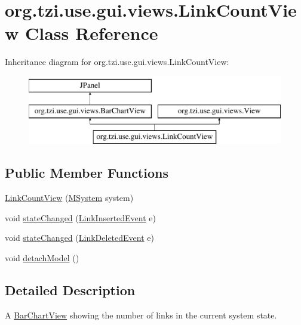 \hypertarget{classorg_1_1tzi_1_1use_1_1gui_1_1views_1_1_link_count_view}{\section{org.\-tzi.\-use.\-gui.\-views.\-Link\-Count\-View Class Reference}
\label{classorg_1_1tzi_1_1use_1_1gui_1_1views_1_1_link_count_view}
}
Inheritance diagram for org.\-tzi.\-use.\-gui.\-views.\-Link\-Count\-View\-:\begin{figure}[H]
\begin{center}
\leavevmode
\includegraphics[height=3.000000cm]{classorg_1_1tzi_1_1use_1_1gui_1_1views_1_1_link_count_view}
\end{center}
\end{figure}
\subsection*{Public Member Functions}
\begin{DoxyCompactItemize}
\item 
\hyperlink{classorg_1_1tzi_1_1use_1_1gui_1_1views_1_1_link_count_view_afc92355271df69704c99af2f7f5754ab}{Link\-Count\-View} (\hyperlink{classorg_1_1tzi_1_1use_1_1uml_1_1sys_1_1_m_system}{M\-System} system)
\item 
void \hyperlink{classorg_1_1tzi_1_1use_1_1gui_1_1views_1_1_link_count_view_a61e2589e4c30d196d5bc4b8e906f3cf1}{state\-Changed} (\hyperlink{classorg_1_1tzi_1_1use_1_1uml_1_1sys_1_1events_1_1_link_inserted_event}{Link\-Inserted\-Event} e)
\item 
void \hyperlink{classorg_1_1tzi_1_1use_1_1gui_1_1views_1_1_link_count_view_aeaaccb68e56e9ea0d2c403d80815f3a4}{state\-Changed} (\hyperlink{classorg_1_1tzi_1_1use_1_1uml_1_1sys_1_1events_1_1_link_deleted_event}{Link\-Deleted\-Event} e)
\item 
void \hyperlink{classorg_1_1tzi_1_1use_1_1gui_1_1views_1_1_link_count_view_a3ec5cc319739e5cc4ec712db777de98e}{detach\-Model} ()
\end{DoxyCompactItemize}


\subsection{Detailed Description}
A \hyperlink{classorg_1_1tzi_1_1use_1_1gui_1_1views_1_1_bar_chart_view}{Bar\-Chart\-View} showing the number of links in the current system state.

